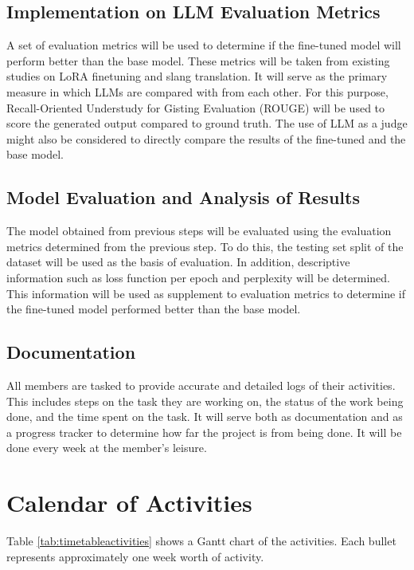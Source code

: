 \subsection{Implementation on LLM Evaluation Metrics}
A set of evaluation metrics will be used to determine if the fine-tuned model will perform better than the base model.
These metrics will be taken from existing studies on LoRA finetuning and slang translation.
It will serve as the primary measure in which LLMs are compared with from each other.
For this purpose, Recall-Oriented Understudy for Gisting Evaluation (ROUGE) will be used to score the generated output compared to ground truth.
The use of LLM as a judge might also be considered to directly compare the results of the fine-tuned and the base model.

\subsection{Model Evaluation and Analysis of Results}
The model obtained from previous steps will be evaluated using the evaluation metrics determined from the previous step.
To do this, the testing set split of the dataset will be used as the basis of evaluation.
In addition, descriptive information such as loss function per epoch and perplexity will be determined.
This information will be used as supplement to evaluation metrics to determine if the fine-tuned model performed better than the base model.

\subsection{Documentation}
All members are tasked to provide accurate and detailed logs of their activities.
This includes steps on the task they are working on, the status of the work being done, and the time spent on the task.
It will serve both as documentation and as a progress tracker to determine how far the project is from being done.
It will be done every week at the member’s leisure.


\section{Calendar of Activities}

	Table \ref{tab:timetableactivities} shows a Gantt chart of the activities.  Each bullet represents approximately
	one week worth of activity.
	
	\newcommand{\weekone}{\textbullet}
	\newcommand{\weektwo}{\textbullet \textbullet}
	\newcommand{\weekthree}{\textbullet \textbullet \textbullet}
	\newcommand{\weekfour}{\textbullet \textbullet \textbullet \textbullet}
	
